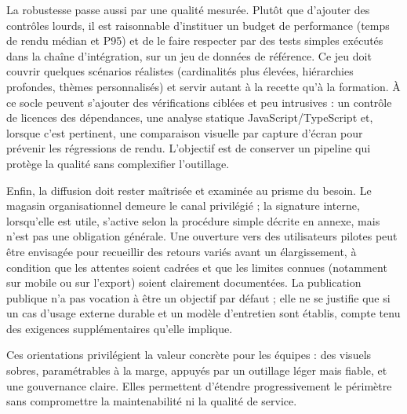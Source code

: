 La robustesse passe aussi par une qualité mesurée. Plutôt que d’ajouter des contrôles lourds, il est raisonnable d’instituer un budget de performance (temps de rendu médian et P95) et de le faire respecter par des tests simples exécutés dans la chaîne d’intégration, sur un jeu de données de référence. Ce jeu doit couvrir quelques scénarios réalistes (cardinalités plus élevées, hiérarchies profondes, thèmes personnalisés) et servir autant à la recette qu’à la formation. À ce socle peuvent s’ajouter des vérifications ciblées et peu intrusives : un contrôle de licences des dépendances, une analyse statique JavaScript/TypeScript et, lorsque c’est pertinent, une comparaison visuelle par capture d’écran pour prévenir les régressions de rendu. L’objectif est de conserver un pipeline qui protège la qualité sans complexifier l’outillage.

Enfin, la diffusion doit rester maîtrisée et examinée au prisme du besoin. Le magasin organisationnel demeure le canal privilégié ; la signature interne, lorsqu’elle est utile, s’active selon la procédure simple décrite en annexe, mais n’est pas une obligation générale. Une ouverture vers des utilisateurs pilotes peut être envisagée pour recueillir des retours variés avant un élargissement, à condition que les attentes soient cadrées et que les limites connues (notamment sur mobile ou sur l’export) soient clairement documentées. La publication publique n’a pas vocation à être un objectif par défaut ; elle ne se justifie que si un cas d’usage externe durable et un modèle d’entretien sont établis, compte tenu des exigences supplémentaires qu’elle implique.

Ces orientations privilégient la valeur concrète pour les équipes : des visuels sobres, paramétrables à la marge, appuyés par un outillage léger mais fiable, et une gouvernance claire. Elles permettent d’étendre progressivement le périmètre sans compromettre la maintenabilité ni la qualité de service.
